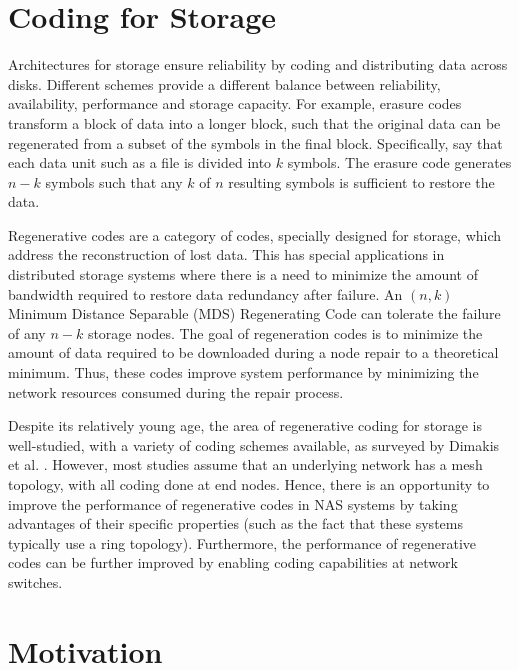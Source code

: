 \section{Coding for Storage}
\indent
Architectures for storage ensure reliability by coding and distributing data across disks. Different schemes provide a different balance between reliability, availability, performance and storage capacity. For example, erasure codes transform a block of data into a longer block, such that the original data can be regenerated from a subset of the symbols in the final block. Specifically, say that each data unit such as a file is divided into $k$ symbols. The erasure code generates $n-k$ symbols such that any $k$ of $n$ resulting symbols is sufficient to restore the data.
 

Regenerative codes are a category of codes, specially designed for storage, which address the reconstruction of lost data. This has special applications in distributed storage systems where there is a need to minimize the amount of bandwidth required to restore data redundancy after failure. An $(n,k)$ Minimum Distance Separable (MDS) Regenerating Code can tolerate the failure of any $n-k$ storage nodes. The goal of regeneration codes is to  minimize the amount of data required to be downloaded during a node repair to a theoretical minimum. Thus, these codes improve system performance by minimizing the network resources consumed during the repair process. 

 Despite its relatively young age, the area of regenerative coding for storage is well-studied, with a variety of coding schemes available, as surveyed by Dimakis et al. \cite{dimakis2011survey}. However, most studies assume that an underlying network has a mesh topology, with all coding done at end nodes. Hence, there is an opportunity to improve the performance of regenerative codes in NAS systems by taking advantages of their specific properties (such as the fact that these systems typically use a ring topology). Furthermore, the performance of regenerative codes can be further improved by enabling coding capabilities at network switches. 



\section{Motivation}

